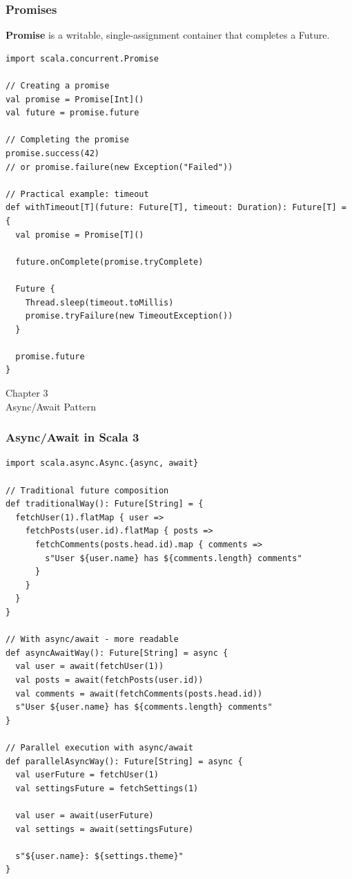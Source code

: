 \documentclass{beamer}
\newcommand{\chapterpage}[2]{
  \begin{frame}[plain]
    \centering
    \vfill
    {\usebeamerfont{title}\usebeamercolor[fg]{title}Chapter #1\\}
    \vspace{0.5cm}
    {\usebeamerfont{subtitle}#2}
    \vfill
  \end{frame}
}
\begin{document}
\begin{frame}[fragile]
\frametitle{Promises}

\textbf{Promise} is a writable, single-assignment container that completes a Future.

\begin{lstlisting}[style=scalaStyle]
import scala.concurrent.Promise

// Creating a promise
val promise = Promise[Int]()
val future = promise.future

// Completing the promise
promise.success(42)
// or promise.failure(new Exception("Failed"))

// Practical example: timeout
def withTimeout[T](future: Future[T], timeout: Duration): Future[T] = {
  val promise = Promise[T]()
  
  future.onComplete(promise.tryComplete)
  
  Future {
    Thread.sleep(timeout.toMillis)
    promise.tryFailure(new TimeoutException())
  }
  
  promise.future
}
\end{lstlisting}

\end{frame}

\chapterpage{3}{Async/Await Pattern}

\begin{frame}[fragile]
\frametitle{Async/Await in Scala 3}

\begin{lstlisting}[style=scalaStyle]
import scala.async.Async.{async, await}

// Traditional future composition
def traditionalWay(): Future[String] = {
  fetchUser(1).flatMap { user =>
    fetchPosts(user.id).flatMap { posts =>
      fetchComments(posts.head.id).map { comments =>
        s"User ${user.name} has ${comments.length} comments"
      }
    }
  }
}

// With async/await - more readable
def asyncAwaitWay(): Future[String] = async {
  val user = await(fetchUser(1))
  val posts = await(fetchPosts(user.id))
  val comments = await(fetchComments(posts.head.id))
  s"User ${user.name} has ${comments.length} comments"
}

// Parallel execution with async/await
def parallelAsyncWay(): Future[String] = async {
  val userFuture = fetchUser(1)
  val settingsFuture = fetchSettings(1)
  
  val user = await(userFuture)
  val settings = await(settingsFuture)
  
  s"${user.name}: ${settings.theme}"
}
\end{lstlisting}

\end{frame}
\end{document}
